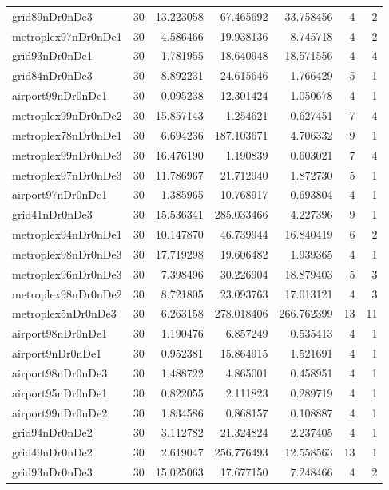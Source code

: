 \documentclass[../../../thesis.tex]{subfiles}
\begin{document}
\begin{longtable}{|l|r|r|r|r|r|r|}
grid89nDr0nDe3 & 30 & 13.223058 & 67.465692 & 33.758456 & 4 & 2 \\
metroplex97nDr0nDe1 & 30 & 4.586466 & 19.938136 & 8.745718 & 4 & 2 \\
grid93nDr0nDe1 & 30 & 1.781955 & 18.640948 & 18.571556 & 4 & 4 \\
grid84nDr0nDe3 & 30 & 8.892231 & 24.615646 & 1.766429 & 5 & 1 \\
airport99nDr0nDe1 & 30 & 0.095238 & 12.301424 & 1.050678 & 4 & 1 \\
metroplex99nDr0nDe2 & 30 & 15.857143 & 1.254621 & 0.627451 & 7 & 4 \\
metroplex78nDr0nDe1 & 30 & 6.694236 & 187.103671 & 4.706332 & 9 & 1 \\
metroplex99nDr0nDe3 & 30 & 16.476190 & 1.190839 & 0.603021 & 7 & 4 \\
metroplex97nDr0nDe3 & 30 & 11.786967 & 21.712940 & 1.872730 & 5 & 1 \\
airport97nDr0nDe1 & 30 & 1.385965 & 10.768917 & 0.693804 & 4 & 1 \\
grid41nDr0nDe3 & 30 & 15.536341 & 285.033466 & 4.227396 & 9 & 1 \\
metroplex94nDr0nDe1 & 30 & 10.147870 & 46.739944 & 16.840419 & 6 & 2 \\
metroplex98nDr0nDe3 & 30 & 17.719298 & 19.606482 & 1.939365 & 4 & 1 \\
metroplex96nDr0nDe3 & 30 & 7.398496 & 30.226904 & 18.879403 & 5 & 3 \\
metroplex98nDr0nDe2 & 30 & 8.721805 & 23.093763 & 17.013121 & 4 & 3 \\
metroplex5nDr0nDe3 & 30 & 6.263158 & 278.018406 & 266.762399 & 13 & 11 \\
airport98nDr0nDe1 & 30 & 1.190476 & 6.857249 & 0.535413 & 4 & 1 \\
airport9nDr0nDe1 & 30 & 0.952381 & 15.864915 & 1.521691 & 4 & 1 \\
airport98nDr0nDe3 & 30 & 1.488722 & 4.865001 & 0.458951 & 4 & 1 \\
airport95nDr0nDe1 & 30 & 0.822055 & 2.111823 & 0.289719 & 4 & 1 \\
airport99nDr0nDe2 & 30 & 1.834586 & 0.868157 & 0.108887 & 4 & 1 \\
grid94nDr0nDe2 & 30 & 3.112782 & 21.324824 & 2.237405 & 4 & 1 \\
grid49nDr0nDe2 & 30 & 2.619047 & 256.776493 & 12.558563 & 13 & 1 \\
grid93nDr0nDe3 & 30 & 15.025063 & 17.677150 & 7.248466 & 4 & 2 \\

\end{longtable}
\end{document}

